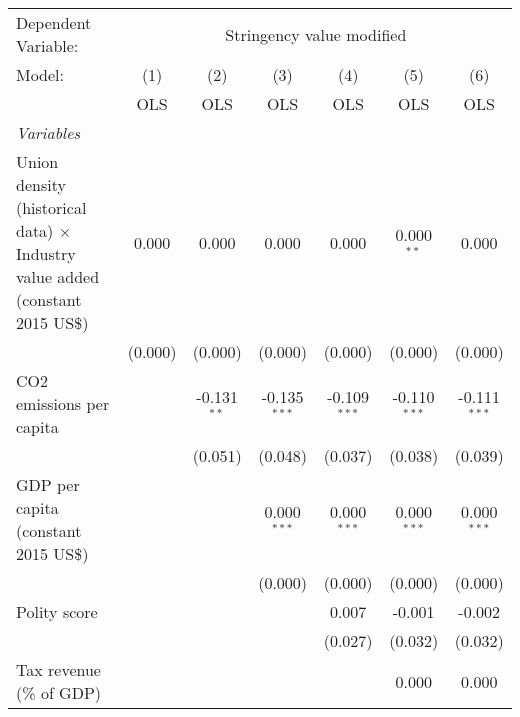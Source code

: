 
\begingroup
\centering
\begin{tabular}{lcccccc}
   \toprule
   Dependent Variable: & \multicolumn{6}{c}{Stringency value modified}\\
   Model:                                                                               & (1)     & (2)           & (3)            & (4)            & (5)            & (6)\\  
                                                                                        &  OLS    & OLS           & OLS            & OLS            & OLS            & OLS\\  
   \midrule
   \emph{Variables}\\
   Union density (historical data) $\times$ Industry value added (constant 2015 US\$)   & 0.000   & 0.000         & 0.000          & 0.000          & 0.000$^{**}$   & 0.000\\   
                                                                                        & (0.000) & (0.000)       & (0.000)        & (0.000)        & (0.000)        & (0.000)\\   
   CO2 emissions per capita                                                             &         & -0.131$^{**}$ & -0.135$^{***}$ & -0.109$^{***}$ & -0.110$^{***}$ & -0.111$^{***}$\\   
                                                                                        &         & (0.051)       & (0.048)        & (0.037)        & (0.038)        & (0.039)\\   
   GDP per capita (constant 2015 US\$)                                                  &         &               & 0.000$^{***}$  & 0.000$^{***}$  & 0.000$^{***}$  & 0.000$^{***}$\\   
                                                                                        &         &               & (0.000)        & (0.000)        & (0.000)        & (0.000)\\   
   Polity score                                                                         &         &               &                & 0.007          & -0.001         & -0.002\\   
                                                                                        &         &               &                & (0.027)        & (0.032)        & (0.032)\\   
   Tax revenue (\% of GDP)                                                              &         &               &                &                & 0.000          & 0.000\\   

\end{tabular}

